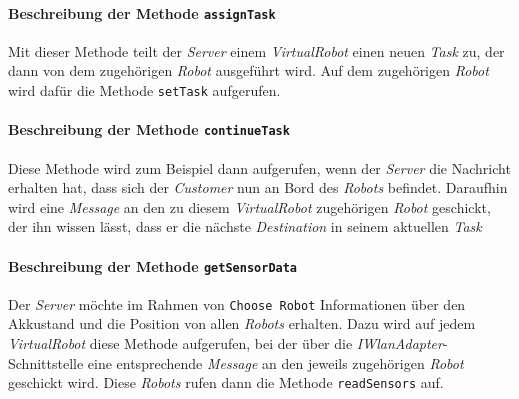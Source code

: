 			\paragraph{Beschreibung der Methode \texttt{assignTask}}
			Mit dieser Methode teilt der \textit{Server} einem \textit{VirtualRobot} einen neuen \textit{Task} zu, der dann von dem zugehörigen \textit{Robot} ausgeführt wird. Auf dem zugehörigen \textit{Robot} wird dafür die Methode \texttt{setTask} aufgerufen.
			
			\paragraph{Beschreibung der Methode \texttt{continueTask}}
			Diese Methode wird zum Beispiel dann aufgerufen, wenn der \textit{Server} die Nachricht erhalten hat, dass sich der \textit{Customer} nun an Bord des \textit{Robots} befindet. Daraufhin wird eine \textit{Message} an den zu diesem \textit{VirtualRobot} zugehörigen \textit{Robot} geschickt, der ihn wissen lässt, dass er die nächste \textit{Destination} in seinem aktuellen \textit{Task}			
			
			\paragraph{Beschreibung der Methode \texttt{getSensorData}}
			Der \textit{Server} möchte im Rahmen von \texttt{Choose Robot} Informationen über den Akkustand und die Position von allen \textit{Robots} erhalten. Dazu wird auf jedem \textit{VirtualRobot} diese Methode aufgerufen, bei der über die \textit{IWlanAdapter}-Schnittstelle eine entsprechende \textit{Message} an den jeweils zugehörigen \textit{Robot} geschickt wird. Diese \textit{Robots} rufen dann die Methode \texttt{readSensors} auf.